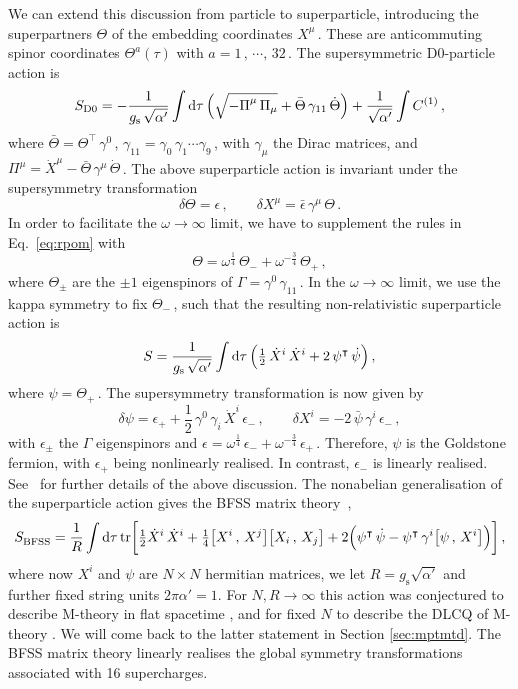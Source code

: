 \documentclass[11pt]{article}
\newcommand{\be}{\begin{equation}}
\newcommand{\ee}{\end{equation}}
\newcommand{\tr}{\text{tr}}
\newcommand{\dd}{\mathrm{d}}
\begin{document}
We can extend this discussion from particle to superparticle, introducing the superpartners $\Theta$ of the embedding coordinates $X^\mu$\,. These are anticommuting spinor coordinates $\Theta^{a} (\tau)$ with $a = 1\,, \, \cdots, \, 32$\,. The supersymmetric D0-particle action is
%
\be
     S_\text{D0} = - \frac{1}{g_\text{s} \, \sqrt{\alpha'}} \int \dd\tau \, \Bigl( \sqrt{- \Pi^\mu_{\phantom{\dagger}} \, \Pi_\mu} + \bar{\Theta} \, \gamma_{11} \, \dot{\Theta} \Bigr) +\frac{1}{\sqrt{\alpha'}} \int C^{(1)}\,,
\ee
%
where $\bar{\Theta} = \Theta^\intercal \, \gamma^0$\,, $\gamma^{}_{11} = \gamma^{}_0 \, \gamma^{}_1 \cdots \gamma^{}_9$\,, with $\gamma^{}_\mu$ the Dirac matrices, and
%
$\Pi^\mu = \dot{X}^\mu - \bar{\Theta} \, \gamma^\mu \, \dot{\Theta}$\,.
%
The above superparticle action is invariant under the supersymmetry transformation
%
\be \label{eq:susytrnsf}
    \delta \Theta = \epsilon\,,
        \qquad%
    \delta X^\mu = \bar{\epsilon} \, \gamma^\mu \, \Theta\,. 
\ee
%
In order to facilitate the $\omega \rightarrow \infty$ limit, we have to supplement the rules in Eq.~\eqref{eq:rpom} with
%
\be
    \Theta = \omega^{\frac{1}{4}} \, \Theta_- + \omega^{-\frac{3}{4}} \, \Theta_+\,,
\ee
%
where $\Theta_\pm$ are the $\pm1$ eigenspinors of $\Gamma = \gamma^0 \, \gamma^{}_{11}$\,. In the $\omega \rightarrow \infty$ limit, we use the kappa symmetry to fix $\Theta_-$\,, such that the resulting non-relativistic superparticle action is
%
\be\label{eq:NRsuperparticle}
    S = \frac{1}{g_\text{s} \, \sqrt{\alpha'}} \int \dd\tau \, \Bigl( \tfrac{1}{2} \, \dot{X}^i \, \dot{X}^i + 2 \, \psi^\intercal \, \dot{\psi} \Bigr)\,,
\ee
%
where $\psi = \Theta_+$\,. The supersymmetry transformation is now given by
%
\be
    \delta \psi = \epsilon_+ + \frac{1}{2} \, \gamma^0 \, \gamma^{}_i \, \dot{X}^i \, \epsilon_-\,,
        \qquad%
    \delta X^i = - 2 \, \bar{\psi} \, \gamma^i \, \epsilon_-\,,
\ee
%
with $\epsilon_\pm$ the $\Gamma$ eigenspinors and
%
$\epsilon = \omega^{\frac{1}{4}} \, \epsilon_- + \omega^{-\frac{3}{4}} \, \epsilon_+$\,.
%
Therefore, $\psi$ is the Goldstone fermion, with $\epsilon_+$ being nonlinearly realised. In contrast, $\epsilon_-$ is linearly realised. See~\cite{Gomis:2004pw} for further details of the above discussion. The nonabelian generalisation of the superparticle action gives the BFSS matrix theory~\cite{baake1985fierz, flume1985quantum, Claudson:1984th, deWit:1988wri, Susskind:1997cw},
%
\be\label{eq:BFSS}
    S^{}_\text{BFSS} = \frac{1}{R} \int \dd\tau \, \tr\biggl[   \tfrac{1}{2} \dot{X}^i \, \dot{X}^i+ \tfrac{1}{4} \bigl[ X^i\,, \, X^j\bigr] \bigl[ X_i\,, \, X_j\bigr]  + 2 \Bigl( \psi^\intercal \, \dot{\psi} - \psi^\intercal \, \gamma^i \bigl[ \psi\,, \, X^i \bigr] \Bigr) \biggr]\,,
\ee
%
where now $X^i$ and $\psi$ are $N \times N$ hermitian matrices, we let $R=g_{\text{s}} \sqrt{\alpha'}$ and further fixed string units $2 \pi \alpha' = 1$. For $N, R \rightarrow \infty$ this action was conjectured to describe M-theory in flat spacetime \cite{Banks:1996vh}, and for fixed $N$ to describe the DLCQ of M-theory \cite{Susskind:1997cw}. We will come back to the latter statement in Section \ref{sec:mptmtd}.
The BFSS matrix theory linearly realises the global symmetry transformations associated with 16 supercharges. 
\end{document}
